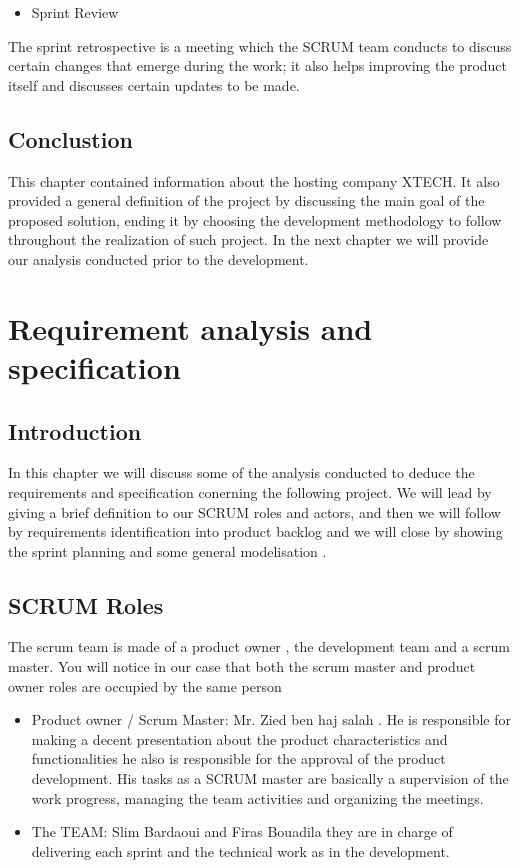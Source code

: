 \documentclass[]{report}
\begin{document}
\begin{itemize}
	\item Sprint Review
\end{itemize}

The sprint retrospective is a meeting which the SCRUM team conducts to
discuss certain changes that emerge during the work; it also helps improving the
product itself and discusses certain updates to be made.

\section{Conclustion}
This chapter contained information about the hosting company XTECH. It also
provided a general definition of the project by discussing the main goal of the
proposed solution, ending it by choosing the development methodology to
follow throughout the realization of such project. In the next chapter we will
provide our analysis conducted prior to the development.






\chapter{Requirement analysis and specification}
\section{Introduction}
In this chapter we will discuss some of the analysis conducted
to deduce the requirements and specification conerning the
following project. We will lead by giving a brief definition to
our SCRUM roles and actors, and then we will follow by
requirements identification into product backlog and we will
close by showing the sprint planning and some general
modelisation .
\section{SCRUM Roles}
The scrum team is made of a product owner , the development
team and a scrum master. You will notice in our case that both
the scrum master and product owner roles are occupied by the
same person
\begin{itemize}
	\item Product owner / Scrum Master: Mr. Zied ben haj salah .
	He is responsible for making a decent presentation about
	the product characteristics and functionalities he also is
	responsible for the approval of the product development.
	His tasks as a SCRUM master are basically a supervision
	of the work progress, managing the team activities and
	organizing the meetings.
	\item The TEAM: Slim Bardaoui and Firas Bouadila they are
	in charge of delivering each sprint and the technical work
	as in the development.
\end{itemize}
\end{document}
